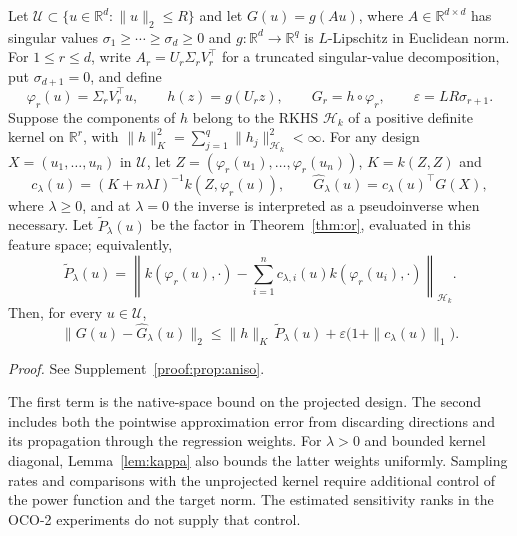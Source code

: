 \begin{proposition}\label{prop:aniso}
Let $\mathcal U\subset\{u\in\mathbb R^d:\|u\|_2\le R\}$ and let
$G(u)=g(Au)$, where $A\in\mathbb R^{d\times d}$ has singular values
$\sigma_1\ge\cdots\ge\sigma_d\ge0$ and
$g:\mathbb R^d\to\mathbb R^q$ is $L$-Lipschitz in Euclidean norm.
For $1\le r\le d$, write
$A_r=U_r\Sigma_rV_r^\top$ for a truncated singular-value decomposition,
put $\sigma_{d+1}=0$, and define
\[
\varphi_r(u)=\Sigma_rV_r^\top u,\qquad
h(z)=g(U_rz),\qquad G_r=h\circ\varphi_r,\qquad
\varepsilon=LR\sigma_{r+1}.
\]
Suppose the components of $h$ belong to the RKHS $\mathcal H_k$ of a
positive definite kernel on $\mathbb R^r$, with
$\|h\|_K^2=\sum_{j=1}^q\|h_j\|_{\mathcal H_k}^2<\infty$.
For any design $X=(u_1,\ldots,u_n)$ in $\mathcal U$, let
$Z=(\varphi_r(u_1),\ldots,\varphi_r(u_n))$, $K=k(Z,Z)$ and
\[
c_\lambda(u)=(K+n\lambda I)^{-1}k(Z,\varphi_r(u)),\qquad
\widehat G_\lambda(u)=c_\lambda(u)^\top G(X),
\]
where $\lambda\ge0$, and at $\lambda=0$ the inverse is interpreted as
a pseudoinverse when necessary. Let $\widetilde P_\lambda(u)$ be the
factor in Theorem~\ref{thm:or}, evaluated in this feature space; equivalently,
\[
\widetilde P_\lambda(u)=
\left\|k(\varphi_r(u),\cdot)
-\sum_{i=1}^n c_{\lambda,i}(u)k(\varphi_r(u_i),\cdot)
\right\|_{\mathcal H_k}.
\]
Then, for every $u\in\mathcal U$,
\[
\|G(u)-\widehat G_\lambda(u)\|_2
\le \|h\|_K\,\widetilde P_\lambda(u)
+\varepsilon\bigl(1+\|c_\lambda(u)\|_1\bigr).
\]
\end{proposition}
\noindent\emph{Proof.} See Supplement~\ref{proof:prop:aniso}.


The first term is the
native-space bound on the projected design. The second includes both the
pointwise approximation error from discarding directions and its propagation
through the regression weights. For $\lambda>0$ and bounded kernel diagonal,
Lemma~\ref{lem:kappa} also bounds the latter weights uniformly. Sampling rates and comparisons with the unprojected kernel require
additional control of the power function and the target norm. The estimated
sensitivity ranks in the OCO-2 experiments do not supply that control.
